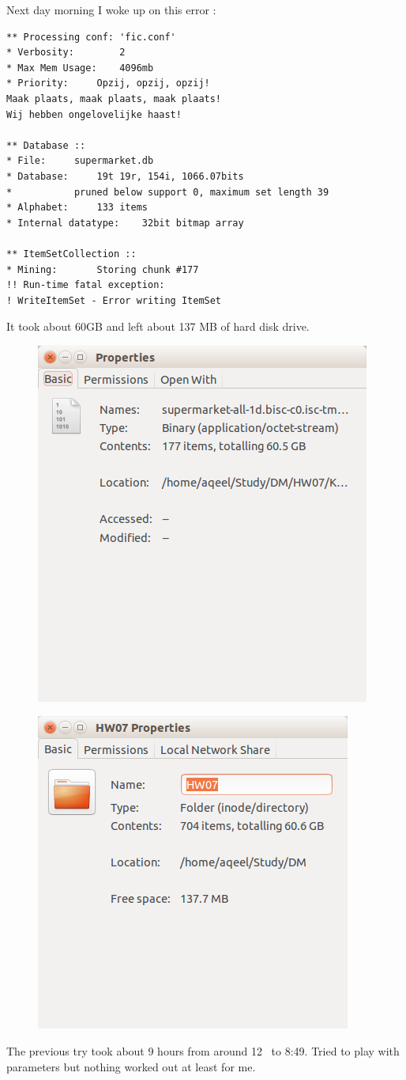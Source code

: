 \documentclass{article}
\begin{document}
Next day morning I woke up on this error :
\begin{lstlisting}
** Processing conf: 'fic.conf'
* Verbosity:		2
* Max Mem Usage:	4096mb
* Priority:		Opzij, opzij, opzij!
Maak plaats, maak plaats, maak plaats!
Wij hebben ongelovelijke haast!

** Database :: 
* File:		supermarket.db
* Database:		19t 19r, 154i, 1066.07bits
* 			pruned below support 0, maximum set length 39
* Alphabet:		133 items
* Internal datatype:	32bit bitmap array

** ItemSetCollection ::
* Mining:		Storing chunk #177             
!! Run-time fatal exception:
! WriteItemSet - Error writing ItemSet
\end{lstlisting}
It took about 60GB and left about 137 MB of hard disk drive.
\begin{figure}[H]
\includegraphics[scale=1]{size.png}
\end{figure}
\begin{figure}[H]
	\includegraphics[scale=1]{space.png}
\end{figure}
The previous try took about 9 hours from around 12~ to 8:49.
Tried to play with parameters but nothing worked out at least for me.\\
\end{document}
